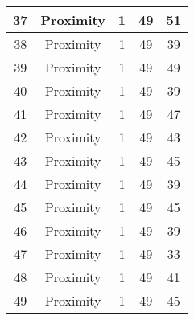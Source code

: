 \documentclass[results.tex]{subfiles}
\begin{document}
\begin{center}
\begin{tabular}{| c || c | c | c | c |}
            \hline
            37                      & Proximity                    & 1                      & 49                      & 51                   \\
            \hline
            38                      & Proximity                    & 1                      & 49                      & 39                   \\
            \hline
            39                      & Proximity                    & 1                      & 49                      & 49                   \\
            \hline
            40                      & Proximity                    & 1                      & 49                      & 39                   \\
            \hline
            41                      & Proximity                    & 1                      & 49                      & 47                   \\
            \hline
            42                      & Proximity                    & 1                      & 49                      & 43                   \\
            \hline
            43                      & Proximity                    & 1                      & 49                      & 45                   \\
            \hline
            44                      & Proximity                    & 1                      & 49                      & 39                   \\
            \hline
            45                      & Proximity                    & 1                      & 49                      & 45                   \\
            \hline
            46                      & Proximity                    & 1                      & 49                      & 39                   \\
            \hline
            47                      & Proximity                    & 1                      & 49                      & 33                   \\
            \hline
            48                      & Proximity                    & 1                      & 49                      & 41                   \\
            \hline
            49                      & Proximity                    & 1                      & 49                      & 45                   \\
            \hline
        \end{tabular}
    \end{center}
\end{document}
